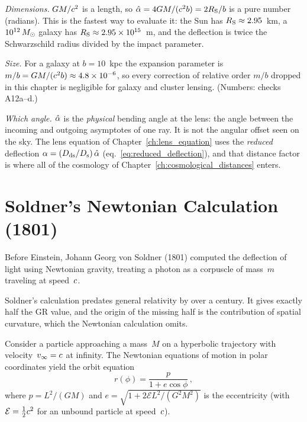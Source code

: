 \begin{annotation}
\textit{Dimensions.}  $G M/c^2$ is a length, so
$\hat{\alpha} = 4G M/(c^2 b) = 2R_{\mathrm{S}}/b$ is a pure number (radians).
This is the fastest way to evaluate it: the Sun has $R_{\mathrm{S}} \approx 2.95$~km, a
$10^{12}\,M_{\odot}$ galaxy has $R_{\mathrm{S}} \approx 2.95\times10^{15}$~m, and the deflection
is twice the Schwarzschild radius divided by the impact parameter.

\textit{Size.}  For a galaxy at $b = 10$~kpc the expansion parameter is
$m/b = G M/(c^2 b) \approx 4.8\times10^{-6}$, so every
correction of relative order $m/b$ dropped in this chapter is negligible
for galaxy and cluster lensing.  (Numbers: checks A12a--d.)

\textit{Which angle.}  $\hat{\alpha}$ is the \emph{physical} bending angle at the
lens: the angle between the incoming and outgoing asymptotes of one ray.  It is
not the angular offset seen on the sky.  The lens equation of Chapter~\ref{ch:lens_equation}
uses the \emph{reduced} deflection
$\alpha = (D_{\mathrm{ds}}/D_{\mathrm{s}})\,\hat{\alpha}$ (eq.~\eqref{eq:reduced_deflection}), and that
distance factor is where all of the cosmology of Chapter~\ref{ch:cosmological_distances} enters.
\end{annotation}

\section{Soldner's Newtonian Calculation (1801)}
\label{sec:soldner}

Before Einstein, Johann Georg von Soldner (1801) computed the deflection
of light using Newtonian gravity, treating a photon as a corpuscle of
mass~$m$ traveling at speed~$c$.

\begin{remark}
Soldner's calculation predates general relativity by over a century.
It gives exactly half the GR value, and the origin of the missing half
is the contribution of spatial curvature, which the Newtonian
calculation omits.
\end{remark}

Consider a particle approaching a mass~$M$ on a hyperbolic trajectory with
velocity~$v_\infty = c$ at infinity.  The Newtonian equations
of motion in polar coordinates yield the orbit equation
\begin{equation}
    r(\phi) = \frac{p}{1 + e\cos\phi} \,,
    \label{eq:newtonian_orbit}
\end{equation}
where $p = L^2/(GM)$ and $e = \sqrt{1 + 2\mathcal{E}L^2/(G^2 M^2)}$ is the
eccentricity (with $\mathcal{E} = \tfrac{1}{2} c^2$ for an unbound
particle at speed~$c$).

